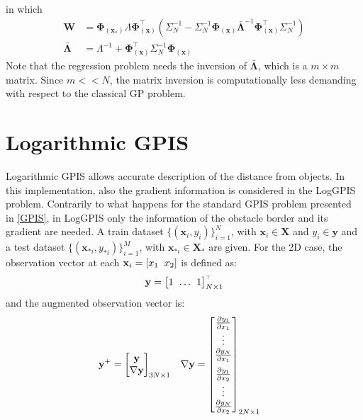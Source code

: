 \documentclass[10pt,a4paper,twocolumn]{article}
\newcommand{\trsp}{{\scriptscriptstyle\top}}
\begin{document}
in which
\begin{align*}
	\mathbf{W} &= \mathbf{\Phi}_{(\mathbf{x}_*)} \Lambda \mathbf{\Phi}_{(\mathbf{x})}^\trsp \left( \Sigma_N^{-1} - \Sigma_N^{-1} \mathbf{\Phi}_{(\mathbf{x})} \mathbf{\bar{\Lambda}}^{-1} \mathbf{\Phi}_{(\mathbf{x})}^\trsp \Sigma_N^{-1} \right) \\
	\mathbf{\bar{\Lambda}} &= \Lambda^{-1} + \mathbf{\Phi}_{(\mathbf{x})}^\trsp \Sigma_N^{-1} \mathbf{\Phi}_{(\mathbf{x})}
\end{align*}
Note that the regression problem needs the inversion of $\mathbf{\bar{\Lambda}}$, which is a $m \times m$ matrix. Since $m << N$, the matrix inversion is computationally less demanding with respect to the classical GP problem.
\section{Logarithmic GPIS}
Logarithmic GPIS allows accurate description of the distance from objects. In this implementation, also the gradient information is considered in the LogGPIS problem. Contrarily to what happens for the standard GPIS problem presented in \autoref{GPIS}, in LogGPIS only the information of the obstacle border and its gradient are needed. A train dataset $ \{ (\mathbf{x}_i, y_i) \}_{i=1}^N$, with $\mathbf{x}_i \in \mathbf{X}$ and $y_i \in \mathbf{y}$ and a test dataset $\{ (\mathbf{x}_{*i}, y_{*i}) \}_{i=1}^M$, with $\mathbf{x}_{*i} \in \mathbf{X_*}$ are given. For the 2D case, the observation vector at each $\mathbf{x}_i = [ x_1 \hspace{2mm} x_2]$ is defined as:
\begin{equation}
	\mathbf{y} = 
	\begin{bmatrix}
		1 \hspace{-5mm} && \ldots && \hspace{-5mm} 1
	\end{bmatrix}^\trsp_{N \times 1}
\end{equation}
and the augmented observation vector is:
\begin{align*}
	\mathbf{y}^+ &= 
	\begin{bmatrix}
		\mathbf{y}	 \\
		\mathbf{\nabla y}
	\end{bmatrix}_{3N \times 1}
	&&
	\mathbf{\nabla y} = 
	\begin{bmatrix}
		\frac{\partial y_1}{\partial x_1} \\
		\vdots \\
		\frac{\partial y_N}{\partial x_1} \vspace{2mm}\\
		\frac{\partial y_1}{\partial x_2} \\
		\vdots \\
		\frac{\partial y_N}{\partial x_2} \\
	\end{bmatrix}_{2N \times 1}
\end{align*}
\end{document}
